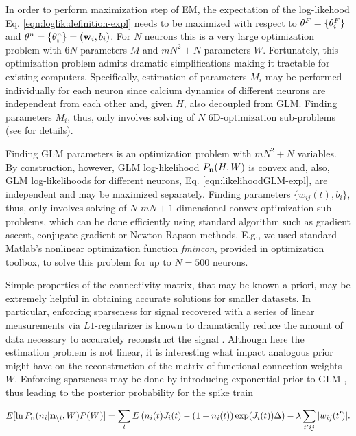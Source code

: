 In order to perform maximization step of EM, the expectation of the log-likehood  Eq. \eqref{eqn:loglik:definition-expl} needs to be maximized with respect to $\mathbf{\theta}^F=\{\mathbf{\theta}^F_i\}$ and $\mathbf{\theta}^n = \{\mathbf{\theta}^n_i\} = (\mathbf{w}_i, b_i)$. For $N$ neurons this is a very large optimization problem with $6N$ parameters $M$ and $m N^2 + N$ parameters $W$.  Fortunately, this optimization problem admits dramatic simplifications making it tractable for existing computers.  Specifically, estimation of parameters $M_i$ may be performed individually for each neuron since calcium dynamics of different neurons are independent from each other and, given $H$, also decoupled from GLM. Finding parameters $M_i$, thus, only involves solving of $N$ 6D-optimization sub-problems (see \cite{Vogelstein2009} for details).

Finding GLM parameters is an optimization problem with $mN^2+N$ variables. By construction, however, GLM log-likelihood $P_{{\bf n}}(H, W)$ is convex and, also, GLM log-likelihoods for different neurons, Eq. \eqref{eqn:likelihoodGLM-expl}, are independent and may be maximized separately. Finding parameters $\{w_{ij}(t), b_i\}$, thus, only involves solving of $N$ $mN+1$-dimensional convex optimization sub-problems, which can be done efficiently using standard algorithm such as gradient ascent, conjugate gradient or Newton-Rapson methods. E.g., we used standard Matlab's nonlinear optimization function {\em fmincon}, provided in optimization toolbox, to solve this problem for up to $N=500$ neurons.

Simple properties of the connectivity matrix, that may be known a priori, may be extremely helpful in obtaining accurate solutions for smaller datasets. In particular, enforcing sparseness for signal recovered with a series of linear measurements via $L1$-regularizer is known to dramatically reduce the amount of data necessary to accurately reconstruct the signal \cite{Candes2005, DE03, Mishchenko2009}. Although here the estimation problem is not linear, it is interesting what impact analogous prior might have on the reconstruction of the matrix of functional connection weights $W$. Enforcing sparseness may be done by introducing exponential prior to GLM \cite{Stevenson2009}, thus leading to the posterior probability for the spike train

\begin{equation}\label{eqn:likelihoodsparseGLM}
E[\ln P_{{\bf n}}(n_i|{\bf n}_{\backslash i}, W)P(W)]=\sum_t E\left( n_i(t) J_i(t) - (1-n_i(t)) \exp(J_i(t)) \Delta \right)-\lambda \sum_{t'ij}|w_{ij}(t')|.
\end{equation}

